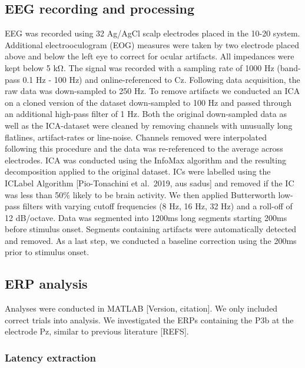 \documentclass[
  man,floatsintext]{apa7}
\begin{document}
\hypertarget{eeg-recording-and-processing}{%
\subsection{EEG recording and processing}\label{eeg-recording-and-processing}}

EEG was recorded using 32 Ag/AgCl scalp electrodes placed in the 10-20 system. Additional electrooculogram (EOG) measures were taken by two electrode placed above and below the left eye to correct for ocular artifacts. All impedances were kept below 5 kΩ. The signal was recorded with a sampling rate of 1000 Hz (band-pass 0.1 Hz - 100 Hz) and online-referenced to Cz. Following data acquisition, the raw data was down-sampled to 250 Hz. To remove artifacts we conducted an ICA on a cloned version of the dataset down-sampled to 100 Hz and passed through an additional high-pass filter of 1 Hz. Both the original down-sampled data as well as the ICA-dataset were cleaned by removing channels with unusually long flatlines, artifact-rates or line-noise. Channels removed were interpolated following this procedure and the data was re-referenced to the average across electrodes. ICA was conducted using the InfoMax algorithm and the resulting decomposition applied to the original dataset. ICs were labelled using the ICLabel Algorithm {[}Pio-Tonachini et al.~2019, aus sadus{]} and removed if the IC was less than 50\% likely to be brain activity. We then applied Butterworth low-pass filters with varying cutoff frequencies (8 Hz, 16 Hz, 32 Hz) and a roll-off of 12 dB/octave. Data was segmented into 1200ms long segments starting 200ms before stimulus onset. Segments containing artifacts were automatically detected and removed. As a last step, we conducted a baseline correction using the 200ms prior to stimulus onset.

\hypertarget{erp-analysis}{%
\subsection{ERP analysis}\label{erp-analysis}}

Analyses were conducted in MATLAB {[}Version, citation{]}. We only included correct trials into analysis. We investigated the ERPs containing the P3b at the electrode Pz, similar to previous literature {[}REFS{]}.

\hypertarget{latency-extraction}{%
\subsubsection{Latency extraction}\label{latency-extraction}}
\end{document}
